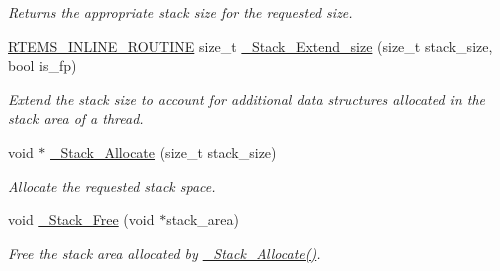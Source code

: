 \begin{DoxyCompactItemize}
\begin{DoxyCompactList}\small\item\em Returns the appropriate stack size for the requested size. \end{DoxyCompactList}\item 
\mbox{\hyperlink{group__RTEMSScoreBaseDefs_gac216239df231d5dbd15e3520b0b9313f}{R\+T\+E\+M\+S\+\_\+\+I\+N\+L\+I\+N\+E\+\_\+\+R\+O\+U\+T\+I\+NE}} size\+\_\+t \mbox{\hyperlink{group__RTEMSScoreStack_gaa7306251dbd0baec560422cbfc02b4ab}{\+\_\+\+Stack\+\_\+\+Extend\+\_\+size}} (size\+\_\+t stack\+\_\+size, bool is\+\_\+fp)
\begin{DoxyCompactList}\small\item\em Extend the stack size to account for additional data structures allocated in the stack area of a thread. \end{DoxyCompactList}\item 
void $\ast$ \mbox{\hyperlink{group__RTEMSScoreStack_gaa75b0bd2f7d99098ec726dbaa343cebe}{\+\_\+\+Stack\+\_\+\+Allocate}} (size\+\_\+t stack\+\_\+size)
\begin{DoxyCompactList}\small\item\em Allocate the requested stack space. \end{DoxyCompactList}\item 
void \mbox{\hyperlink{group__RTEMSScoreStack_ga66b144669f2508254620147bedd9baaa}{\+\_\+\+Stack\+\_\+\+Free}} (void $\ast$stack\+\_\+area)
\begin{DoxyCompactList}\small\item\em Free the stack area allocated by \mbox{\hyperlink{group__RTEMSScoreStack_gaa75b0bd2f7d99098ec726dbaa343cebe}{\+\_\+\+Stack\+\_\+\+Allocate()}}. \end{DoxyCompactList}\end{DoxyCompactItemize}
